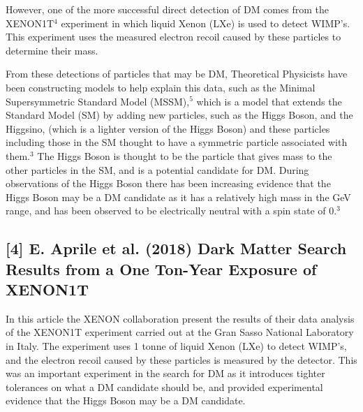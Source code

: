 \documentclass[]{article}
\begin{document}
\par
However, one of the more successful direct detection of DM comes from the 
XENON1T$^4$ experiment in which liquid Xenon (LXe) is used to detect WIMP's.
This experiment uses the measured electron recoil caused by these particles
to determine their mass. 
\par
\parskip 0.2cm

\parskip 0.2cm
From these detections of particles that may be DM, Theoretical Physicists have
been constructing models to help explain this data, such as the Minimal Supersymmetric
Standard Model (MSSM),$^5$ which is a model that extends the Standard Model (SM) by
adding new particles, such as the Higgs Boson, and the Higgsino, (which is a
lighter version of the Higgs Boson) and these particles including those in the SM 
thought to have a symmetric particle associated with them.$^3$ The Higgs Boson is thought to be the particle
that gives mass to the other particles in the SM, and is a potential 
candidate for DM. During observations of the Higgs Boson there has been increasing
evidence that the Higgs Boson may be a DM candidate
as it has a relatively high mass in the GeV range, and has been observed
to be electrically neutral with a spin state of 0.$^3$
\parskip 0.2cm
\newpage
\noindent 
\subsection*{[4] E. Aprile et al. (2018) Dark Matter Search Results from a One Ton-Year Exposure of XENON1T}

\parskip 0.2cm
In this article the XENON collaboration present the results of their data analysis
of the XENON1T experiment carried out at the Gran Sasso National Laboratory in Italy.
The experiment uses  1 tonne of liquid Xenon (LXe) to detect WIMP's, and the 
electron recoil caused by these particles is measured by the detector. This was an 
important experiment in the search for DM as it introduces tighter tolerances on what 
a DM candidate should be, and provided experimental evidence that the Higgs Boson
may be a DM candidate.\parskip 0.2cm

\noindent 
\end{document}
